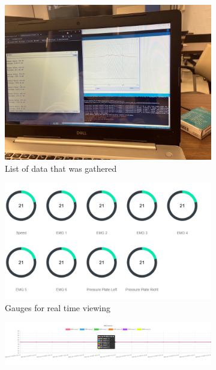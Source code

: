 \begin{figure}[h]
     \centering
     \begin{subfigure}[h]{0.45\textwidth}
         \centering
         \includegraphics[width=\textwidth]{Progress_Report/figs/EmgReadings.jpg}
         \caption{List of data that was gathered}
         \label{fig:EMG Readings}
     \end{subfigure}
     \hfill
     \begin{subfigure}[h]{0.45\textwidth}
         \centering
         \includegraphics[width=\textwidth]{Progress_Report/figs/emgs.png}
         \caption{Gauges for real time viewing}
         \label{fig:emg gauges}
     \end{subfigure}
     \hfill
     \begin{subfigure}[h]{0.45\textwidth}
         \centering
         \includegraphics[width=\textwidth]{Progress_Report/figs/graph.png}

\end{subfigure}
\end{figure}
